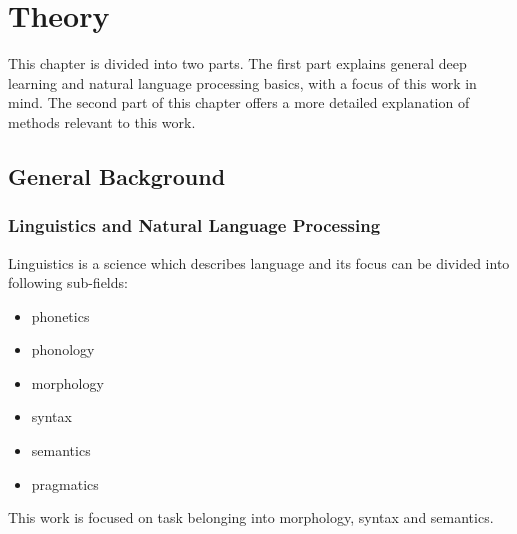 

\chapter{Theory}
\label{chap:theandme}
This chapter is divided into two parts. The first part explains general deep learning and natural language processing basics, with a focus of this work in mind. The second part of this chapter offers a more detailed explanation of methods relevant to this work.

\section{General Background}


\subsection{Linguistics and Natural Language Processing}

Linguistics is a science which describes language and its focus can be divided into following sub-fields:
\begin{itemize}
\item phonetics
\item phonology
\item  morphology
\item syntax
\item semantics
\item pragmatics
\end{itemize}

This work is focused on task belonging into morphology, syntax and semantics. 

